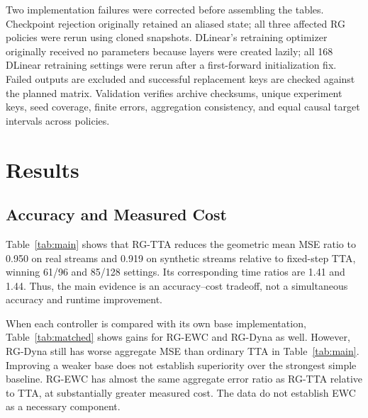 \documentclass[conference]{IEEEtran}
\begin{document}
Two implementation failures were corrected before assembling the tables. Checkpoint rejection originally retained an aliased state; all three affected RG policies were rerun using cloned snapshots. DLinear's retraining optimizer originally received no parameters because layers were created lazily; all 168 DLinear retraining settings were rerun after a first-forward initialization fix. Failed outputs are excluded and successful replacement keys are checked against the planned matrix. Validation verifies archive checksums, unique experiment keys, seed coverage, finite errors, aggregation consistency, and equal causal target intervals across policies.

\section{Results}
\begin{table}[t]
\centering
\caption{Main causal batch matrix. Columns 2--4 summarize 96 real-stream settings; columns 5--7 summarize 128 synthetic settings. Ratios are geometric means after averaging three seeds. Time is total measured pipeline time. Lower ratios are better; wins are descriptive. Retrain uses a different recipe and includes auxiliary training overhead.}
\label{tab:main}

\end{table}

\subsection{Accuracy and Measured Cost}
Table~\ref{tab:main} shows that RG-TTA reduces the geometric mean MSE ratio to 0.950 on real streams and 0.919 on synthetic streams relative to fixed-step TTA, winning 61/96 and 85/128 settings. Its corresponding time ratios are 1.41 and 1.44. Thus, the main evidence is an accuracy--cost tradeoff, not a simultaneous accuracy and runtime improvement.

When each controller is compared with its own base implementation, Table~\ref{tab:matched} shows gains for RG-EWC and RG-Dyna as well. However, RG-Dyna still has worse aggregate MSE than ordinary TTA in Table~\ref{tab:main}. Improving a weaker base does not establish superiority over the strongest simple baseline. RG-EWC has almost the same aggregate error ratio as RG-TTA relative to TTA, at substantially greater measured cost. The data do not establish EWC as a necessary component.

\begin{table}[t]
\centering
\caption{All 224 settings, each controller versus its own base: TTA, EWC, or local Dyna-style.}
\label{tab:matched}

\end{table}
\end{document}
